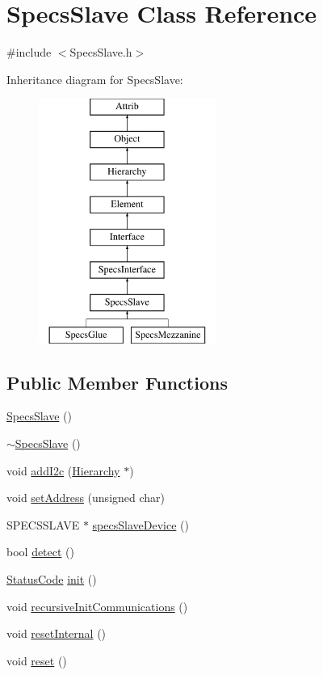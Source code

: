 \hypertarget{classSpecsSlave}{}\section{Specs\+Slave Class Reference}
\label{classSpecsSlave}


{\ttfamily \#include $<$Specs\+Slave.\+h$>$}

Inheritance diagram for Specs\+Slave\+:\begin{figure}[H]
\begin{center}
\leavevmode
\includegraphics[height=8.000000cm]{classSpecsSlave}
\end{center}
\end{figure}
\subsection*{Public Member Functions}
\begin{DoxyCompactItemize}
\item 
\hyperlink{classSpecsSlave_a4170ce73e2fd5ce2b8a7b8ef55226556}{Specs\+Slave} ()
\item 
\hyperlink{classSpecsSlave_a8194c1d1a4e7a0e250e5b7dd72b0b437}{$\sim$\+Specs\+Slave} ()
\item 
void \hyperlink{classSpecsSlave_af462b4d6e716ceb4bd454ad835938737}{add\+I2c} (\hyperlink{classHierarchy}{Hierarchy} $\ast$)
\item 
void \hyperlink{classSpecsSlave_a1e5917c1f323cd7b4aabe4940c6baf12}{set\+Address} (unsigned char)
\item 
S\+P\+E\+C\+S\+S\+L\+A\+VE $\ast$ \hyperlink{classSpecsSlave_a44970aca61b6fdcd6d6d90e6601093f3}{specs\+Slave\+Device} ()
\item 
bool \hyperlink{classSpecsSlave_aa1411ca849bda04215518b08535185e2}{detect} ()
\item 
\hyperlink{classStatusCode}{Status\+Code} \hyperlink{classSpecsSlave_ab34b5117373a334027d3a5cf33287bb6}{init} ()
\item 
void \hyperlink{classSpecsSlave_a347b94c2ba660ccde6927fe72590a1bc}{recursive\+Init\+Communications} ()
\item 
void \hyperlink{classSpecsSlave_aa4f2493eabe522bb6651abcd67a6a690}{reset\+Internal} ()
\item 
void \hyperlink{classSpecsSlave_a6c69baff5941cabed2947f547041bbeb}{reset} ()
\end{DoxyCompactItemize}
